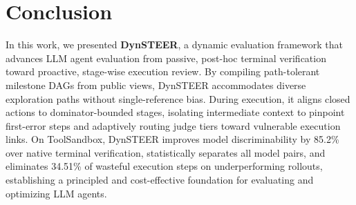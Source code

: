 \section{Conclusion}
\label{sec:conclusion}

In this work, we presented \textbf{DynSTEER}, a dynamic evaluation framework that advances LLM agent evaluation from passive, post-hoc terminal verification toward proactive, stage-wise execution review. By compiling path-tolerant milestone DAGs from public views, DynSTEER accommodates diverse exploration paths without single-reference bias. During execution, it aligns closed actions to dominator-bounded stages, isolating intermediate context to pinpoint first-error steps and adaptively routing judge tiers toward vulnerable execution links. On ToolSandbox, DynSTEER improves model discriminability by 85.2\% over native terminal verification, statistically separates all model pairs, and eliminates 34.51\% of wasteful execution steps on underperforming rollouts, establishing a principled and cost-effective foundation for evaluating and optimizing LLM agents.